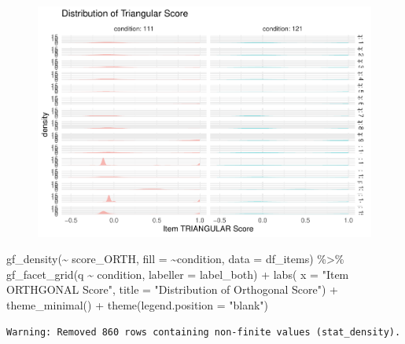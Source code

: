 \documentclass[
  letterpaper,
  DIV=11,
  numbers=noendperiod]{scrreprt}
\newenvironment{Shaded}{\begin{snugshade}}{\end{snugshade}}
\newcommand{\AttributeTok}[1]{\textcolor[rgb]{0.40,0.45,0.13}{#1}}
\newcommand{\FunctionTok}[1]{\textcolor[rgb]{0.28,0.35,0.67}{#1}}
\newcommand{\NormalTok}[1]{\textcolor[rgb]{0.00,0.23,0.31}{#1}}
\newcommand{\SpecialCharTok}[1]{\textcolor[rgb]{0.37,0.37,0.37}{#1}}
\newcommand{\StringTok}[1]{\textcolor[rgb]{0.13,0.47,0.30}{#1}}
\begin{document}
\begin{figure}[H]

{\centering \includegraphics{analysis/SGC3A/2_sgc3A_scoring_files/figure-pdf/unnamed-chunk-83-2.pdf}

}

\end{figure}

\begin{Shaded}
\begin{Highlighting}[]
\FunctionTok{gf\_density}\NormalTok{(}\SpecialCharTok{\textasciitilde{}}\NormalTok{ score\_ORTH, }\AttributeTok{fill =} \SpecialCharTok{\textasciitilde{}}\NormalTok{condition, }\AttributeTok{data =}\NormalTok{ df\_items) }\SpecialCharTok{\%\textgreater{}\%} 
  \FunctionTok{gf\_facet\_grid}\NormalTok{(q }\SpecialCharTok{\textasciitilde{}}\NormalTok{ condition, }\AttributeTok{labeller =}\NormalTok{ label\_both) }\SpecialCharTok{+} 
  \FunctionTok{labs}\NormalTok{( }\AttributeTok{x =} \StringTok{"Item ORTHGONAL Score"}\NormalTok{, }\AttributeTok{title =} \StringTok{"Distribution of Orthogonal Score"}\NormalTok{) }\SpecialCharTok{+} \FunctionTok{theme\_minimal}\NormalTok{() }\SpecialCharTok{+} \FunctionTok{theme}\NormalTok{(}\AttributeTok{legend.position =} \StringTok{"blank"}\NormalTok{)}
\end{Highlighting}
\end{Shaded}

\begin{verbatim}
Warning: Removed 860 rows containing non-finite values (stat_density).
\end{verbatim}
\end{document}
